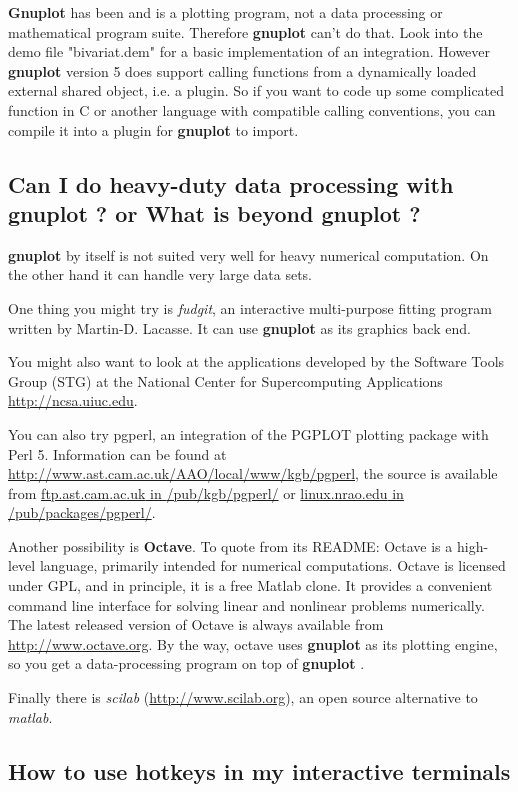 \documentclass[a4paper,11pt]{article}
\def\http#1{{\small\href{http://#1}{\url{http://#1}}}}
\def\ftp#1#2{\href{ftp://#1#2}{\url{#1} in \url{#2}}}
\newcommand{\ftp}[2]%
            {\htmladdnormallink{\latex{\url{#1}{} in \url{#2}}%
                    \html{\textit{#1} in \textit{#2}}}%
                {ftp://#1#2}%
            }
\newcommand{\http}[1]%
            {\htmladdnormallink{\latex{\url{http://#1}}%
                    \html{\textit{http://#1}}}%
                {http://#1}%
            }
\newcommand{\gnuplot}{\textbf{gnuplot }}
\newcommand{\Gnuplot}{\textbf{Gnuplot }}
\begin{document}
\Gnuplot{} has been and is a plotting program, not a data
processing or mathematical program suite. Therefore \gnuplot
can't do that. Look into the demo file "bivariat.dem" for a basic
implementation of an integration.  However \gnuplot version 5 does
support calling functions from a dynamically loaded external shared
object, i.e. a plugin.  So if you want to code up some complicated
function in C or another language with compatible calling conventions,
you can compile it into a plugin for \gnuplot to import.

\subsection{Can I do heavy-duty data processing with \gnuplot? or
What is beyond \gnuplot?}

\gnuplot by itself is not suited very well for heavy numerical computation. 
On the other hand it can handle very large data sets.

One thing you might try is \textit{fudgit}, an interactive multi-purpose
fitting program written by Martin-D. Lacasse.
It can use \gnuplot as its graphics back end.

You might also want to look at the applications developed by
the Software Tools Group (STG) at the National Center for
Supercomputing Applications \http{ncsa.uiuc.edu}.

You can also try pgperl, an integration of the PGPLOT plotting
package with Perl 5. Information can be found at
\http{www.ast.cam.ac.uk/AAO/local/www/kgb/pgperl}, the source is
available from \ftp{ftp.ast.cam.ac.uk}{/pub/kgb/pgperl/} or
\ftp{linux.nrao.edu}{/pub/packages/pgperl/}.

Another possibility is \textbf{Octave}. To quote from its README: Octave is a
high-level language, primarily intended for numerical computations. Octave is
licensed under GPL, and in principle, it is a free Matlab clone. It provides a
convenient command line interface for solving linear and nonlinear problems
numerically. The latest released version of Octave is always available from
\http{www.octave.org}. By the way, octave uses \gnuplot as its plotting
engine, so you get a data-processing program on top of \gnuplot.

Finally there is \textit{scilab} (\http{www.scilab.org}), an open source
alternative to \textit{matlab}.


\subsection{How to use hotkeys in my interactive terminals}
\end{document}
